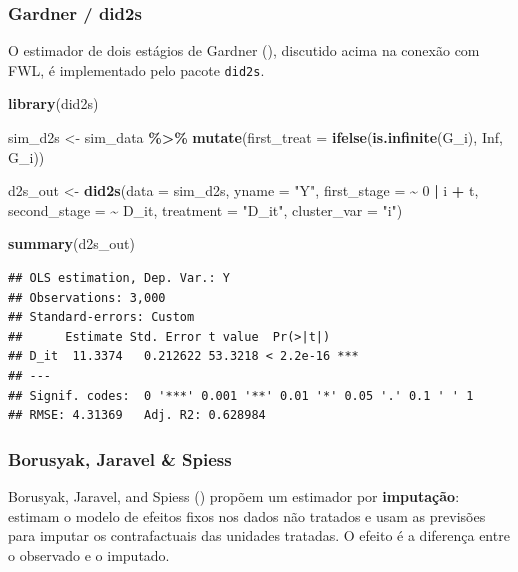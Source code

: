 \documentclass[
]{article}
\newenvironment{Shaded}{\begin{snugshade}}{\end{snugshade}}
\newcommand{\AttributeTok}[1]{\textcolor[rgb]{0.13,0.29,0.53}{#1}}
\newcommand{\ConstantTok}[1]{\textcolor[rgb]{0.56,0.35,0.01}{#1}}
\newcommand{\DecValTok}[1]{\textcolor[rgb]{0.00,0.00,0.81}{#1}}
\newcommand{\FunctionTok}[1]{\textcolor[rgb]{0.13,0.29,0.53}{\textbf{#1}}}
\newcommand{\NormalTok}[1]{#1}
\newcommand{\OtherTok}[1]{\textcolor[rgb]{0.56,0.35,0.01}{#1}}
\newcommand{\SpecialCharTok}[1]{\textcolor[rgb]{0.81,0.36,0.00}{\textbf{#1}}}
\newcommand{\StringTok}[1]{\textcolor[rgb]{0.31,0.60,0.02}{#1}}
\begin{document}
\subsubsection{Gardner / did2s}\label{gardner-did2s}

O estimador de dois estágios de Gardner (), discutido acima na conexão com FWL, é implementado pelo pacote \texttt{did2s}.

\begin{Shaded}
\begin{Highlighting}[]
\FunctionTok{library}\NormalTok{(did2s)}

\NormalTok{sim\_d2s }\OtherTok{\textless{}{-}}\NormalTok{ sim\_data }\SpecialCharTok{\%\textgreater{}\%}
  \FunctionTok{mutate}\NormalTok{(}\AttributeTok{first\_treat =} \FunctionTok{ifelse}\NormalTok{(}\FunctionTok{is.infinite}\NormalTok{(G\_i), }\ConstantTok{Inf}\NormalTok{, G\_i))}

\NormalTok{d2s\_out }\OtherTok{\textless{}{-}} \FunctionTok{did2s}\NormalTok{(}\AttributeTok{data =}\NormalTok{ sim\_d2s,}
                 \AttributeTok{yname =} \StringTok{"Y"}\NormalTok{,}
                 \AttributeTok{first\_stage =} \SpecialCharTok{\textasciitilde{}} \DecValTok{0} \SpecialCharTok{|}\NormalTok{ i }\SpecialCharTok{+}\NormalTok{ t,}
                 \AttributeTok{second\_stage =} \SpecialCharTok{\textasciitilde{}}\NormalTok{ D\_it,}
                 \AttributeTok{treatment =} \StringTok{"D\_it"}\NormalTok{,}
                 \AttributeTok{cluster\_var =} \StringTok{"i"}\NormalTok{)}

\FunctionTok{summary}\NormalTok{(d2s\_out)}
\end{Highlighting}
\end{Shaded}

\begin{verbatim}
## OLS estimation, Dep. Var.: Y
## Observations: 3,000
## Standard-errors: Custom 
##      Estimate Std. Error t value  Pr(>|t|)    
## D_it  11.3374   0.212622 53.3218 < 2.2e-16 ***
## ---
## Signif. codes:  0 '***' 0.001 '**' 0.01 '*' 0.05 '.' 0.1 ' ' 1
## RMSE: 4.31369   Adj. R2: 0.628984
\end{verbatim}

\subsubsection{Borusyak, Jaravel \& Spiess}\label{borusyak-jaravel-spiess}

Borusyak, Jaravel, and Spiess () propõem um estimador por \textbf{imputação}: estimam o modelo de efeitos fixos nos dados não tratados e usam as previsões para imputar os contrafactuais das unidades tratadas. O efeito é a diferença entre o observado e o imputado.
\end{document}

